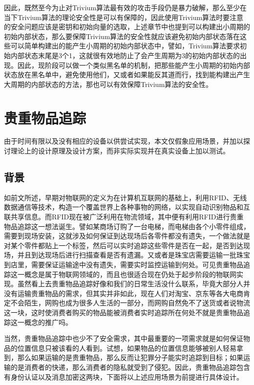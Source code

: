 因此，既然至今为止对Trivium算法最有效的攻击手段仍是暴力破解，那么至少在当下Trivium算法的理论安全性是可以有保障的，因此使用Trivium算法时要注意的安全问题应该是密钥和初始向量的选取，上述章节中也提到可以构建出小周期的初始内部状态，那么要保障Trivium算法的安全性就应该避免初始内部状态落在这些可以简单构建出的能产生小周期的初始内部状态中，譬如，Trivium算法要求初始内部状态末尾是3个1，这就很有效地防止了会产生周期为3的初始内部状态的出现。因此，现阶段可以做一个类似黑名单的机制，把那些能产生小周期的初始内部状态放在黑名单中，避免使用他们，又或者如果能反其道而行，找到能构建出产生大周期的内部状态的方法，那也可以有效保障Trivium算法的安全性。

\section{贵重物品追踪}

由于时间有限以及没有相应的设备以供尝试实现，本文仅假象应用场景，并加以探讨理论上的设计原理及设计方案，而非实际实现并在真实设备上加以测试。


\subsection{背景}

如前文所述，早期对物联网的定义为在计算机互联网的基础上，利用RFID、无线数据通信等技术，构造一个覆盖世界上各种事物的网络，以实现自动识别物品和互联共享信息。而RFID现在被广泛利用在物流领域，其中便有利用RFID进行贵重物品追踪这一想法诞生。譬如某商场订购了一台电梯，而电梯由各个小零件组成，需要到现场安装，这就涉及如何保证到达现场后各零件都没有遗失，一个做法就是对某个零件都贴上一个标签，然后可以实时追踪这些零件是否在一起，是否到达现场，并且到达现场后进行扫描查看是否有遗漏。又或者是珠宝店需要运输一批珠宝到店里，需要保证运输途中没有遗失，需要实时监控运输到何处。可见贵重物品追踪这一概念是属于物联网领域的，而且也很适合现在仍处于起步阶段的物联网实现。虽然看上去贵重物品追踪好像和我们的日常生活没什么联系，毕竟大部分人并没有运输贵重物品的需求，但其实并非如此，现在人们对淘宝、京东等各大电商肯定不会陌生，网购也成为很多人生活的一部分，而网购自然免不了送货或者说物流这一块，这时使消费者购买的物品能被消费者实时追踪所在何处不就是贵重物品追踪这一概念的推广吗。

当然，贵重物品追踪中也少不了安全需求，其中最重要的一项需求就是如何保证物品的位置信息只被该看的人看到。试想，如果物品的位置信息能够被别人轻易拿到，那么如果运输的是贵重物品，那么反而让犯罪分子能实时追踪到目标；如果运输的是消费者的快递，那么消费者的隐私就受到了侵犯。因此，贵重物品追踪包含有身份认证以及消息加密这两块，下面将以上述应用场景为前提进行具体设计。


